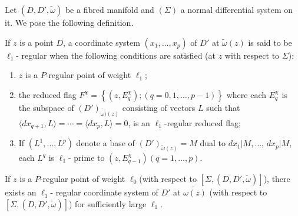 Let $(D, D', \tilde{\omega})$ be a fibred manifold and $(\Sigma)$ a
normal differential system on it. We pose the following definition. 

\begin{defi*}
  If $z$ is a point $D$, a coordinate system $(x_1, \ldots , x_p)$ of
  $D'$ at $\tilde{\omega}(z)$ is said to be $\ell_1$- regular when the
  following conditions are satisfied (at $z$ with respect to
  $\Sigma$): 
  \begin{enumerate}[\rm (i)]
  \item $z$ is a $P$-regular point of weight $\ell_1$;
  \item the reduced flag $F^\chi = \left\{ (z, E^\chi_q ); (q=0, 1,
    \ldots , p-1)\right\}$ where each $E^\chi_q$ is the subspace of
    $(D')_{\tilde{\omega)} (z)}$ consisting of vectors $L$  such that
    $\langle dx_{q+1}, L \rangle= \cdots = \langle dx_p, L \rangle=0 $,
    is an $\ell_1$-regular reduced flag; 
  \item If $(L^1, \ldots, L^p)$ denote a base of
    $(D')_{\tilde{\omega}(z)}= M$ dual to $dx_1| M, \ldots$, $dx_p |M$,
    each $L^q$ is $\ell_1$- prime to $(z, E^\chi_{q-1}) (q=1, \ldots,
    p)$. 
  \end{enumerate}
\end{defi*} 
 
\begin{theorem}\label{chap3:sec3.12:thm3}%
  If $z$ is a $P$-regular point of weight $\ell_0$(with respect
  to\break 
  $[\Sigma, (D, D', \tilde{\omega})]$), there exists an $\ell_1$-
  regular coordinate system of $D'$ at $\tilde{\omega (z)}$ (with
  respect to $[\Sigma , (D, D', \tilde{\omega})]$) for sufficiently\pageoriginale
  large $\ell_1$.  
\end{theorem} 

